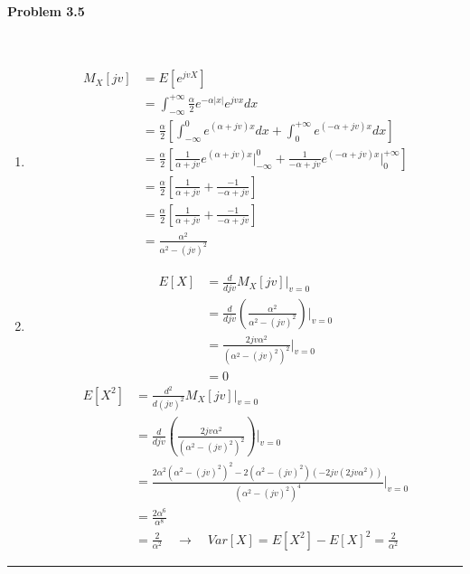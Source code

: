 \documentclass[12pt, letterpaper]{scrartcl}
\begin{document}
\paragraph*{Problem 3.5} \hfill\\
\begin{enumerate}[((a))]
    \item
    \begin{align*}
        M_X[jv]&=E[e^{jvX}]\\
        &=\int_{-\infty}^{+\infty}\frac{\alpha}{2}e^{-\alpha|x|}e^{jvx}dx\\
        &=\frac{\alpha}{2}[\int_{-\infty}^{0}e^{(\alpha+jv)x}dx+\int_{0}^{+\infty}e^{(-\alpha+jv)x}dx]\\
        &=\frac{\alpha}{2}[\frac{1}{\alpha+jv}e^{(\alpha+jv)x}\bigg\rvert^{0}_{-\infty}+\frac{1}{-\alpha+jv}e^{(-\alpha+jv)x}\bigg\rvert^{+\infty}_{0}]\\
        &=\frac{\alpha}{2}[\frac{1}{\alpha+jv}+\frac{-1}{-\alpha+jv}]\\
        &=\frac{\alpha}{2}[\frac{1}{\alpha+jv}+\frac{-1}{-\alpha+jv}]\\
        &=\frac{\alpha^2}{\alpha^2-(jv)^2}
    \end{align*}
    \item
    \begin{align*}
        E[X]&=\frac{d}{djv}M_X[jv]\bigg\rvert_{v=0}\\
        &=\frac{d}{djv}(\frac{\alpha^2}{\alpha^2-(jv)^2})\bigg\rvert_{v=0}\\
        &=\frac{2jv\alpha^2}{(\alpha^2-(jv)^2)^2}\bigg\rvert_{v=0}\\
        &=0
    \end{align*}
    \begin{align*}
        E[X^2]&=\frac{d^2}{d(jv)^2}M_X[jv]\bigg\rvert_{v=0}\\
        &=\frac{d}{djv}(\frac{2jv\alpha^2}{(\alpha^2-(jv)^2)^2})\bigg\rvert_{v=0}\\
        &=\frac{2\alpha^2(\alpha^2-(jv)^2)^2-2(\alpha^2-(jv)^2)(-2jv(2jv\alpha^2))}{(\alpha^2-(jv)^2)^4}\bigg\rvert_{v=0}\\
        &=\frac{2\alpha^6}{\alpha^8}\\
        &=\frac{2}{\alpha^2}\quad\longrightarrow\quad Var[X]=E[X^2]-E[X]^2=\frac{2}{\alpha^2}
    \end{align*}
\end{enumerate}
\hrule
\end{document}
